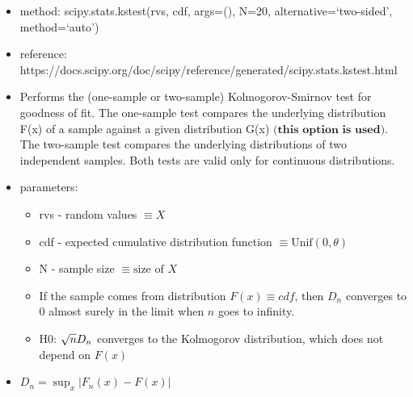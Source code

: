 \documentclass[11pt]{article}
\providecommand{\tightlist}{%
      \setlength{\itemsep}{0pt}\setlength{\parskip}{0pt}}
\begin{document}
\begin{itemize}
\tightlist
\item
  method: scipy.stats.kstest(rvs, cdf, args=(), N=20,
  alternative=`two-sided', method=`auto')
\item
  reference:
  https://docs.scipy.org/doc/scipy/reference/generated/scipy.stats.kstest.html
\item
  Performs the (one-sample or two-sample) Kolmogorov-Smirnov test for
  goodness of fit. The one-sample test compares the underlying
  distribution F(x) of a sample against a given distribution G(x)
  \(\textbf{(this option is used)}\). The two-sample test compares the
  underlying distributions of two independent samples. Both tests are
  valid only for continuous distributions.
\item
  parameters:

  \begin{itemize}
  \tightlist
  \item
    rvs - random values \(\equiv X\)
  \item
    cdf - expected cumulative distribution function
    \(\equiv \text{Unif}(0,\theta)\)
  \item
    N - sample size \(\equiv \text{size of } X\)
  \item
    If the sample comes from distribution \(F(x) \equiv cdf\), then
    \(D_n\) converges to 0 almost surely in the limit when
    \({\displaystyle n}\) goes to infinity.
  \item
    H0: \({\sqrt {n}}D_{n} \space\space\) converges to the Kolmogorov
    distribution, which does not depend on \(F(x)\)
  \end{itemize}
\item
  \(D_{n}=\sup _{x}|F_{n}(x)-F(x)|\)
\end{itemize}
\end{document}
